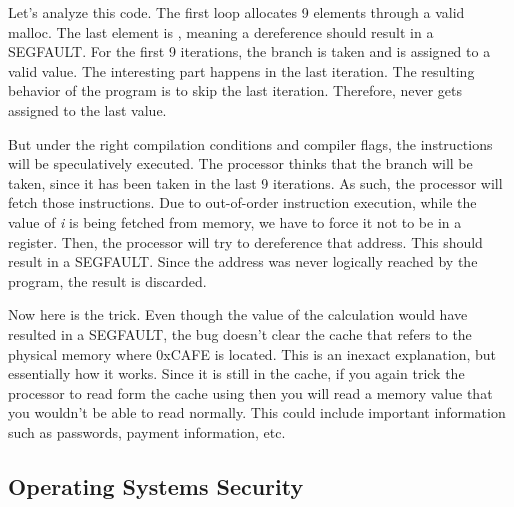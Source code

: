 Let's analyze this code.
The first loop allocates 9 elements through a valid malloc.
The last element is , meaning a dereference should result in a SEGFAULT.
For the first 9 iterations, the branch is taken and  is assigned to a valid value.
The interesting part happens in the last iteration.
The resulting behavior of the program is to skip the last iteration.
Therefore,  never gets assigned to the last value.

But under the right compilation conditions and compiler flags, the instructions will be speculatively executed.
The processor thinks that the branch will be taken, since it has been taken in the last 9 iterations.
As such, the processor will fetch those instructions.
Due to out-of-order instruction execution, while the value of \emph{i} is being fetched from memory, we have to force it not to be in a register.
Then, the processor will try to dereference that address.
This should result in a SEGFAULT.
Since the address was never logically reached by the program, the result is discarded.

Now here is the trick.
Even though the value of the calculation would have resulted in a SEGFAULT, the bug doesn't clear the cache that refers to the physical memory where 0xCAFE is located. This is an inexact explanation, but essentially how it works.
Since it is still in the cache, if you again trick the processor to read form the cache using  then you will read a memory value that you wouldn't be able to read normally.
This could include important information such as passwords, payment information, etc.

\subsection{Operating Systems Security}

